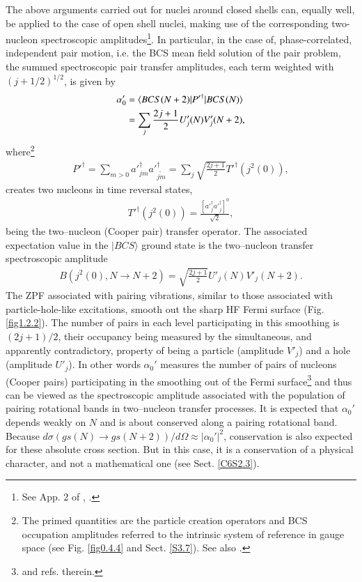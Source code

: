 The above arguments carried out for nuclei around closed shells can,  equally well, be applied to the case of open shell nuclei, making use of the corresponding two-nucleon spectroscopic amplitudes\footnote{See App. 2 of \cite{Broglia:73}, \cite{Yoshida:62}.}.
In particular, in the case of, phase-correlated, independent pair motion, i.e. the BCS mean field solution of the pair problem, the summed spectroscopic pair transfer amplitudes, each term weighted with $(j+1/2)^{1/2}$, is given by
\begin{align}\label{eq1.2.14}
\nonumber \alpha_0'&=\langle {BCS(N+2)|P'^\dagger|BCS(N)} \rangle\\
&=\sum_{j}\frac{2j+1}{2}U'_j(N)V'_j(N+2),
\end{align}
where\footnote{The primed quantities are the particle creation operators and BCS occupation amplitudes referred to the intrinsic system of reference in gauge space (see  Fig. \ref{fig0.4.4} and Sect. \ref{S3.7}). See also \cite{Potel:13b}.}
\begin{align}\label{eq1.2.15}
P'^\dagger=\sum_{m>0}a'^\dagger_{jm}a'^\dagger_{\widetilde{jm}}=\sum_j\sqrt{\frac{2j+1}{2}}T'^{\dagger}(j^2(0)),
\end{align}
creates two nucleons in time reversal states, 
\begin{align}\label{eq1.2.16}
T'^{\dagger}(j^2(0))=\frac{\left[a'^\dagger_ja'^\dagger_j\right]^0}{\sqrt{2}},
\end{align}
being the two--nucleon (Cooper pair) transfer operator. The associated expectation value in the $|BCS\rangle$ ground state is the two--nucleon transfer spectroscopic amplitude  
\begin{align}\label{eq1.2.17}
B(j^2(0),N\to N+2)=\sqrt{\frac{2j+1}{2}}U'_j(N)V'_j(N+2).
\end{align}
The ZPF associated with pairing vibrations, similar to those associated with particle-hole-like excitations,  smooth out the sharp HF Fermi surface (Fig. \ref{fig1.2.2}). The number of pairs in each level participating in this smoothing is $(2j+1)/2$, their occupancy being measured by the simultaneous, and apparently contradictory, property of being a particle (amplitude $V'_j$) and a hole (amplitude $U'_j$). In other words $\alpha_0'$ measures the number of pairs of nucleons (Cooper pairs) participating in the smoothing out of the Fermi surface\footnote{\cite{Schrieffer:64,Potel:17} and refs. therein.} and thus can be viewed as the spectroscopic amplitude associated with the population of pairing rotational bands in two--nucleon transfer processes. It is expected that $\alpha_0'$ depends weakly on $N$ and is about conserved along a pairing rotational band. Because $d\sigma(gs(N)\rightarrow gs(N+2))/d\Omega\approx|\alpha_0'|^2$, conservation is also expected for these absolute cross section. But in this case, it is a conservation of a physical character, and not a mathematical one (see Sect. \ref{C6S2.3}). 


